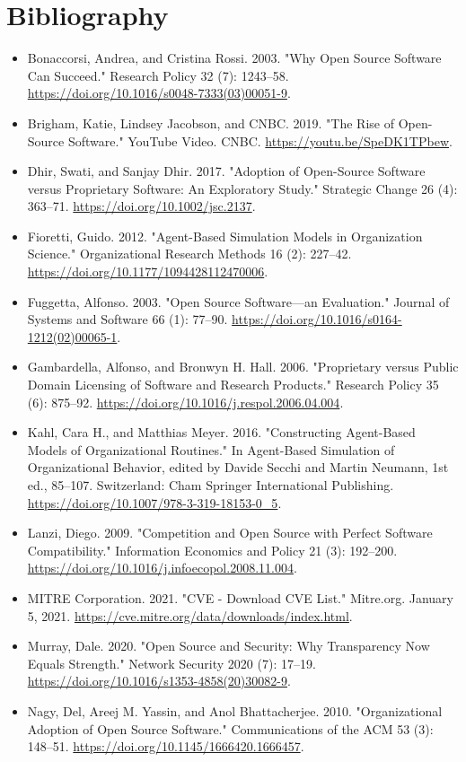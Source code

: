 \documentclass[10pt, a4paper, fleqn]{article}
\begin{document}
\section{Bibliography}
\begin{itemize}
	\item Bonaccorsi, Andrea, and Cristina Rossi. 2003. "Why Open Source Software Can Succeed." Research Policy 32 (7): 1243–58. \url{https://doi.org/10.1016/s0048-7333(03)00051-9}.
	\item Brigham, Katie, Lindsey Jacobson, and CNBC. 2019. "The Rise of Open-Source Software." YouTube Video. CNBC. \url{https://youtu.be/SpeDK1TPbew}.
	\item Dhir, Swati, and Sanjay Dhir. 2017. "Adoption of Open-Source Software versus Proprietary Software: An Exploratory Study." Strategic Change 26 (4): 363–71. \url{https://doi.org/10.1002/jsc.2137}.
	\item Fioretti, Guido. 2012. "Agent-Based Simulation Models in Organization Science." Organizational Research Methods 16 (2): 227–42. \url{https://doi.org/10.1177/1094428112470006}.
	\item Fuggetta, Alfonso. 2003. "Open Source Software––an Evaluation." Journal of Systems and Software 66 (1): 77–90. \url{https://doi.org/10.1016/s0164-1212(02)00065-1}.
	\item Gambardella, Alfonso, and Bronwyn H. Hall. 2006. "Proprietary versus Public Domain Licensing of Software and Research Products." Research Policy 35 (6): 875–92. \url{https://doi.org/10.1016/j.respol.2006.04.004}.
	\item Kahl, Cara H., and Matthias Meyer. 2016. "Constructing Agent-Based Models of Organizational Routines." In Agent-Based Simulation of Organizational Behavior, edited by Davide Secchi and Martin Neumann, 1st ed., 85–107. Switzerland: Cham Springer International Publishing. \url{https://doi.org/10.1007/978-3-319-18153-0\_5}.
	\item Lanzi, Diego. 2009. "Competition and Open Source with Perfect Software Compatibility." Information Economics and Policy 21 (3): 192–200. \url{https://doi.org/10.1016/j.infoecopol.2008.11.004}.
	\item MITRE Corporation. 2021. "CVE - Download CVE List." Mitre.org. January 5, 2021. \url{https://cve.mitre.org/data/downloads/index.html}.
	\item Murray, Dale. 2020. "Open Source and Security: Why Transparency Now Equals Strength." Network Security 2020 (7): 17–19. \url{https://doi.org/10.1016/s1353-4858(20)30082-9}.
	\item Nagy, Del, Areej M. Yassin, and Anol Bhattacherjee. 2010. "Organizational Adoption of Open Source Software." Communications of the ACM 53 (3): 148–51. \url{https://doi.org/10.1145/1666420.1666457}.

\end{itemize}
\end{document}
